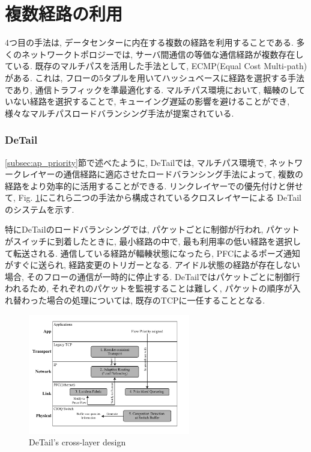 \section{複数経路の利用}
\label{subsec:u-multipath}
4つ目の手法は, データセンターに内在する複数の経路を利用することである. 
多くのネットワークトポロジーでは, サーバ間通信の等価な通信経路が複数存在している. 
既存のマルチパスを活用した手法として, ECMP(Equal Cost Multi-path)がある. 
これは,  フローの5タプルを用いてハッシュベースに経路を選択する手法であり, 通信トラフィックを準最適化する. 
マルチパス環境において, 輻輳のしていない経路を選択することで, キューイング遅延の影響を避けることができ,
様々なマルチパスロードバランシング手法が提案されている. 

\subsubsection{DeTail}
\ref{subsec:ap_priority}節で述べたように, DeTail\cite{detail}では, マルチパス環境で,
ネットワークレイヤーの通信経路に適応させたロードバランシング手法によって, 複数の経路をより効率的に活用することができる. 
リンクレイヤーでの優先付けと併せて, Fig. \ref{fig:detail_crosslayer}にこれら二つの手法から構成されているクロスレイヤーによる
DeTailのシステムを示す. 

特にDeTailのロードバランシングでは, パケットごとに制御が行われ, パケットがスイッチに到着したときに, 最小経路の中で,
最も利用率の低い経路を選択して転送される. 
通信している経路が輻輳状態になったら, PFCによるポーズ通知がすぐに送られ, 経路変更のトリガーとなる. 
アイドル状態の経路が存在しない場合, そのフローの通信が一時的に停止する.
DeTailではパケットごとに制御行われるため, それぞれのパケットを監視することは難しく, パケットの順序が入れ替わった場合の処理については,
既存のTCPに一任することとなる.
\begin{figure}[t]
    \begin{center}
    \includegraphics[autoebb, width=200pt]{./img/detal.pdf}
    \caption{DeTail's cross-layer design}
    \label{fig:detail_crosslayer}
    \end{center}
\end{figure}



